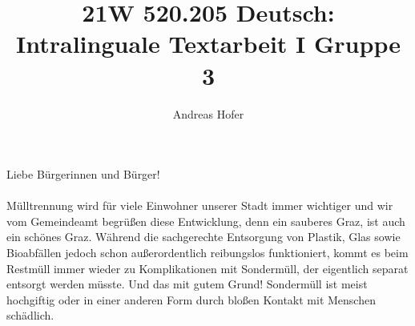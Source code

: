 \documentclass{article}
\title{21W 520.205 Deutsch: Intralinguale Textarbeit I Gruppe 3}
\author{Andreas Hofer}
\begin{document}
	Liebe Bürgerinnen und Bürger! \\ \\
	Mülltrennung wird für viele Einwohner unserer Stadt immer wichtiger und wir vom Gemeindeamt begrüßen diese Entwicklung, denn ein sauberes Graz, ist auch ein schönes Graz. Während die sachgerechte Entsorgung von Plastik, Glas sowie Bioabfällen jedoch schon außerordentlich reibungslos funktioniert, kommt es beim Restmüll immer wieder zu Komplikationen mit Sondermüll, der eigentlich separat entsorgt werden müsste. Und das mit gutem Grund! Sondermüll ist meist hochgiftig oder in einer anderen Form durch bloßen Kontakt mit Menschen schädlich. 
\end{document}
